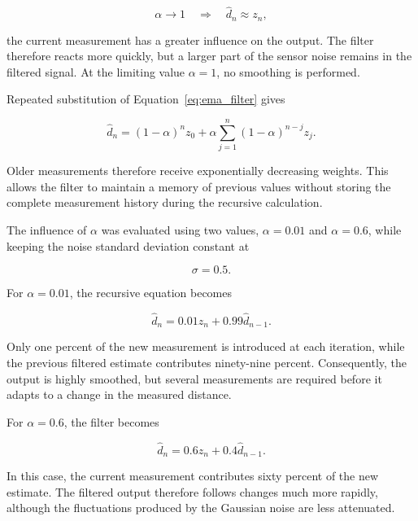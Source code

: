 \documentclass[10pt,twocolumn,a4paper]{article}
\begin{document}
\[
    \alpha \rightarrow 1
    \quad\Rightarrow\quad
    \hat{d}_n \approx z_n,
\]

the current measurement has a greater influence on the output. The
filter therefore reacts more quickly, but a larger part of the sensor
noise remains in the filtered signal. At the limiting value
$\alpha=1$, no smoothing is performed.

Repeated substitution of Equation~\eqref{eq:ema_filter} gives

\begin{equation}
    \hat{d}_n
    =
    (1-\alpha)^n z_0
    +
    \alpha
    \sum_{j=1}^{n}
    (1-\alpha)^{n-j}z_j.
    \label{eq:ema_expansion}
\end{equation}

Older measurements therefore receive exponentially decreasing weights.
This allows the filter to maintain a memory of previous values without
storing the complete measurement history during the recursive
calculation.

The influence of $\alpha$ was evaluated using two values,
$\alpha=0.01$ and $\alpha=0.6$, while keeping the noise standard
deviation constant at

\[
    \sigma = 0.5.
\]

For $\alpha=0.01$, the recursive equation becomes

\[
    \hat{d}_n
    =
    0.01z_n
    +
    0.99\hat{d}_{n-1}.
\]

Only one percent of the new measurement is introduced at each
iteration, while the previous filtered estimate contributes
ninety-nine percent. Consequently, the output is highly smoothed, but
several measurements are required before it adapts to a change in the
measured distance.

For $\alpha=0.6$, the filter becomes

\[
    \hat{d}_n
    =
    0.6z_n
    +
    0.4\hat{d}_{n-1}.
\]

In this case, the current measurement contributes sixty percent of the
new estimate. The filtered output therefore follows changes much more
rapidly, although the fluctuations produced by the Gaussian noise are
less attenuated.
\end{document}
